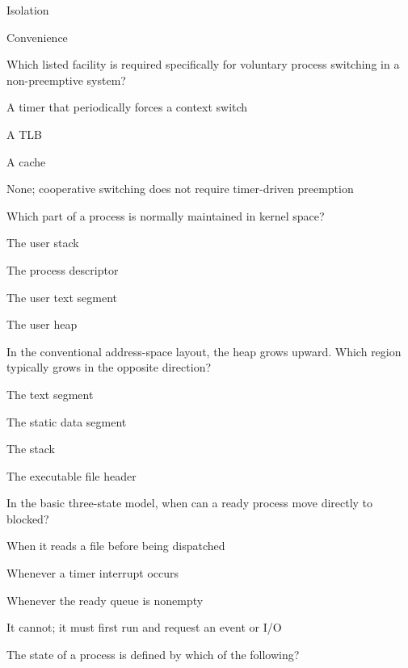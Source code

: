 \begin{questions}
\begin{verticalchoices}
\item Isolation
\item Convenience
\end{verticalchoices}
\question Which listed facility is required specifically for voluntary process switching in a non-preemptive system?
\begin{verticalchoices}
\item A timer that periodically forces a context switch
\item A TLB
\item A cache
\item None; cooperative switching does not require timer-driven preemption
\end{verticalchoices}
\end{questions}\vfill\newpage
\begin{questions}\setlength{\itemsep}{0.12cm}\setcounter{question}{6}
\question Which part of a process is normally maintained in kernel space?
\begin{verticalchoices}
\item The user stack
\item The process descriptor
\item The user text segment
\item The user heap
\end{verticalchoices}
\question In the conventional address-space layout, the heap grows upward. Which region typically grows in the opposite direction?
\begin{verticalchoices}
\item The text segment
\item The static data segment
\item The stack
\item The executable file header
\end{verticalchoices}
\question In the basic three-state model, when can a ready process move directly to blocked?
\begin{verticalchoices}
\item When it reads a file before being dispatched
\item Whenever a timer interrupt occurs
\item Whenever the ready queue is nonempty
\item It cannot; it must first run and request an event or I/O
\end{verticalchoices}
\question The state of a process is defined by which of the following?
\begin{verticalchoices}

\end{verticalchoices}
\end{questions}
